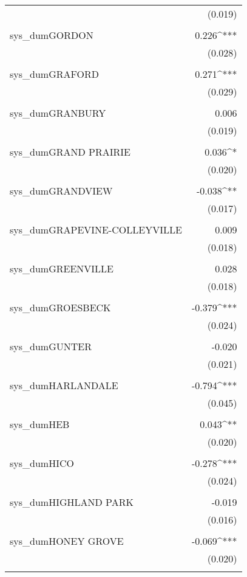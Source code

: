 \begin{table}[!htbp]
\begin{tabular}{@{\extracolsep{5pt}}lD{.}{.}{-3} }
  & (0.019) \\ 
  & \\ 
 sys\_dumGORDON & 0.226^{***} \\ 
  & (0.028) \\ 
  & \\ 
 sys\_dumGRAFORD & 0.271^{***} \\ 
  & (0.029) \\ 
  & \\ 
 sys\_dumGRANBURY & 0.006 \\ 
  & (0.019) \\ 
  & \\ 
 sys\_dumGRAND PRAIRIE & 0.036^{*} \\ 
  & (0.020) \\ 
  & \\ 
 sys\_dumGRANDVIEW & -0.038^{**} \\ 
  & (0.017) \\ 
  & \\ 
 sys\_dumGRAPEVINE-COLLEYVILLE & 0.009 \\ 
  & (0.018) \\ 
  & \\ 
 sys\_dumGREENVILLE & 0.028 \\ 
  & (0.018) \\ 
  & \\ 
 sys\_dumGROESBECK & -0.379^{***} \\ 
  & (0.024) \\ 
  & \\ 
 sys\_dumGUNTER & -0.020 \\ 
  & (0.021) \\ 
  & \\ 
 sys\_dumHARLANDALE & -0.794^{***} \\ 
  & (0.045) \\ 
  & \\ 
 sys\_dumHEB & 0.043^{**} \\ 
  & (0.020) \\ 
  & \\ 
 sys\_dumHICO & -0.278^{***} \\ 
  & (0.024) \\ 
  & \\ 
 sys\_dumHIGHLAND PARK & -0.019 \\ 
  & (0.016) \\ 
  & \\ 
 sys\_dumHONEY GROVE & -0.069^{***} \\ 
  & (0.020) \\ 
  & \\ 

\end{tabular}
\end{table}
